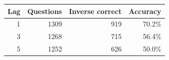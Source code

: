 \begin{tabular}{rrrr}\toprule
Lag & Questions & Inverse correct & Accuracy\\\midrule
1 & 1309 & 919 & 70.2\%\\
3 & 1268 & 715 & 56.4\%\\
5 & 1252 & 626 & 50.0\%\\
\bottomrule\end{tabular}
